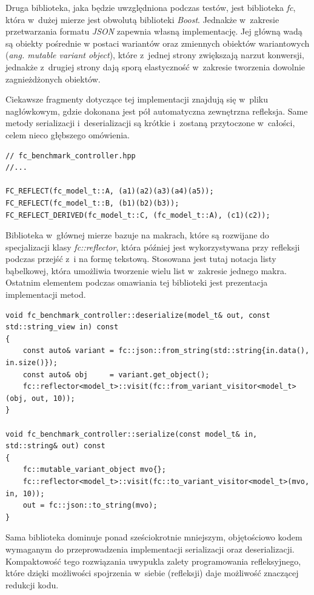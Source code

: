 \documentclass[12pt]{article}
\newcommand{\n}{\newline}
\newcommand{\nonpl}[1]{{\it #1}}
\newcommand{\code}[1]{{\it #1}}
\newcommand{\ang}[1]{\nonpl{ang. #1}}
\newcommand{\JSON}{\nonpl{JSON} }
\begin{document}
{{{				Druga biblioteka, jaka będzie uwzględniona podczas testów, jest biblioteka \nonpl{fc}\cite{fc_repo}, która w~dużej mierze jest obwolutą biblioteki
				\nonpl{Boost}\cite{boost}. Jednakże w~zakresie przetwarzania formatu \JSON zapewnia własną implementację. Jej główną wadą są obiekty pośrednie
				w postaci wariantów oraz zmiennych obiektów wariantowych (\ang{mutable variant object}), które z~jednej strony zwiększają narzut konwersji,
				jednakże z~drugiej strony dają sporą elastyczność w~zakresie tworzenia dowolnie zagnieżdżonych obiektów.\n

				Ciekawsze fragmenty dotyczące tej implementacji znajdują się w~pliku nagłówkowym, gdzie dokonana jest pół automatyczna zewnętrzna refleksja. Same
				metody serializacji i~deserializacji są krótkie i~zostaną przytoczone w~całości, celem nieco głębszego omówienia.\n

				\begin{lstlisting}[frame=single]
// fc_benchmark_controller.hpp
//...

FC_REFLECT(fc_model_t::A, (a1)(a2)(a3)(a4)(a5));
FC_REFLECT(fc_model_t::B, (b1)(b2)(b3));
FC_REFLECT_DERIVED(fc_model_t::C, (fc_model_t::A), (c1)(c2));
				\end{lstlisting}

				Biblioteka w~głównej mierze bazuje na makrach, które są rozwijane do specjalizacji klasy \code{fc::reflector}, która później jest
				wykorzystywana przy refleksji podczas przejść z~i na formę tekstową. Stosowana jest tutaj notacja listy bąbelkowej, która umożliwia
				tworzenie wielu list w~zakresie jednego makra. Ostatnim elementem podczas omawiania tej biblioteki jest prezentacja implementacji metod.\n

				\begin{lstlisting}[frame=single]
void fc_benchmark_controller::deserialize(model_t& out, const std::string_view in) const
{
	const auto& variant = fc::json::from_string(std::string{in.data(), in.size()});
	const auto& obj	    = variant.get_object();
	fc::reflector<model_t>::visit(fc::from_variant_visitor<model_t>(obj, out, 10));
}

void fc_benchmark_controller::serialize(const model_t& in, std::string& out) const
{
	fc::mutable_variant_object mvo{};
	fc::reflector<model_t>::visit(fc::to_variant_visitor<model_t>(mvo, in, 10));
	out = fc::json::to_string(mvo);
}
				\end{lstlisting}

				Sama biblioteka dominuje ponad sześciokrotnie mniejszym, objętościowo kodem wymaganym do przeprowadzenia implementacji
				serializacji oraz deserializacji. Kompaktowość tego rozwiązania uwypukla zalety programowania refleksyjnego, które dzięki
				możliwości spojrzenia w~siebie (refleksji) daje możliwość znaczącej redukcji kodu.\n

}}}
\end{document}
